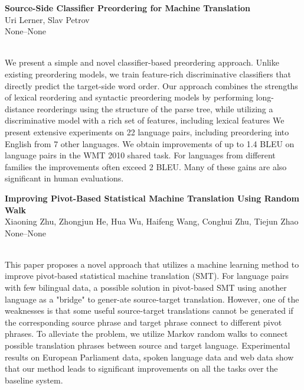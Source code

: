 \documentclass[twoside,makeidx]{book}
\renewcommand{\normalsize}{\fontsize{8}{9}\selectfont}
\renewcommand{\small}{\fontsize{7}{8}\selectfont}
\begin{document}
\par\vspace{2em}\noindent%
\begin{minipage}{\linewidth}%
\begin{center}
\textbf{\normalsize Source-Side Classifier Preordering for Machine Translation}\\
\normalsize  Uri Lerner,  Slav Petrov\\
{\small None--None}\\
\end{center}
\end{minipage}\\[0.5em]
\nopagebreak%
\noindent%
{\small We present a simple and novel classifier-based preordering approach. Unlike existing preordering models, we train feature-rich discriminative classifiers that directly predict the target-side word order.  Our approach combines the strengths of lexical reordering and syntactic preordering models by performing long-distance reorderings using the structure of the parse tree, while utilizing a discriminative model with a rich set of features, including lexical features  We present extensive experiments on 22 language pairs, including preordering into English from 7 other languages. We obtain improvements of up to 1.4 BLEU on language pairs in the WMT 2010 shared task.                                      For languages from different families the improvements often exceed 2 BLEU. Many of these gains are also significant in human evaluations.}
\par\vspace{2em}\noindent%
\begin{minipage}{\linewidth}%
\begin{center}
\textbf{\normalsize Improving Pivot-Based Statistical Machine Translation Using Random Walk}\\
\normalsize  Xiaoning Zhu,  Zhongjun He,  Hua Wu,  Haifeng Wang,  Conghui Zhu,  Tiejun Zhao\\
{\small None--None}\\
\end{center}
\end{minipage}\\[0.5em]
\nopagebreak%
\noindent%
{\small This paper proposes a novel approach that utilizes a machine learning method to improve pivot-based statistical machine translation (SMT). For language pairs with few bilingual data, a possible solution in pivot-based SMT using another language as a "bridge" to gener-ate source-target translation. However, one of the weaknesses is that some useful source-target translations cannot be generated if the corresponding source phrase and target phrase connect to different pivot phrases. To alleviate the problem, we utilize Markov random walks to connect possible translation phrases between source and target language. Experimental results on European Parliament data, spoken language data and web data show that our method leads to significant improvements on all the tasks over the baseline system.}
\end{document}
